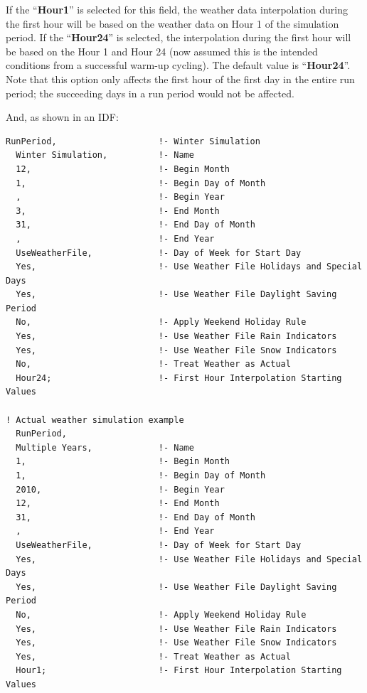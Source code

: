If the ``\textbf{Hour1}'' is selected for this field, the weather data interpolation during the first hour will be based on the weather data on Hour 1 of the simulation period. If the ``\textbf{Hour24}'' is selected, the interpolation during the first hour will be based on the Hour 1 and Hour 24 (now assumed this is the intended conditions from a successful warm-up cycling). The default value is ``\textbf{Hour24}''. Note that this option only affects the first hour of the first day in the entire run period; the succeeding days in a run period would not be affected.

And, as shown in an IDF:

\begin{lstlisting}
RunPeriod,                    !- Winter Simulation
  Winter Simulation,          !- Name
  12,                         !- Begin Month
  1,                          !- Begin Day of Month
  ,                           !- Begin Year
  3,                          !- End Month
  31,                         !- End Day of Month
  ,                           !- End Year
  UseWeatherFile,             !- Day of Week for Start Day
  Yes,                        !- Use Weather File Holidays and Special Days
  Yes,                        !- Use Weather File Daylight Saving Period
  No,                         !- Apply Weekend Holiday Rule
  Yes,                        !- Use Weather File Rain Indicators
  Yes,                        !- Use Weather File Snow Indicators
  No,                         !- Treat Weather as Actual
  Hour24;                     !- First Hour Interpolation Starting Values

! Actual weather simulation example
  RunPeriod,
  Multiple Years,             !- Name
  1,                          !- Begin Month
  1,                          !- Begin Day of Month
  2010,                       !- Begin Year
  12,                         !- End Month
  31,                         !- End Day of Month
  ,                           !- End Year
  UseWeatherFile,             !- Day of Week for Start Day
  Yes,                        !- Use Weather File Holidays and Special Days
  Yes,                        !- Use Weather File Daylight Saving Period
  No,                         !- Apply Weekend Holiday Rule
  Yes,                        !- Use Weather File Rain Indicators
  Yes,                        !- Use Weather File Snow Indicators
  Yes,                        !- Treat Weather as Actual
  Hour1;                      !- First Hour Interpolation Starting Values
\end{lstlisting}

